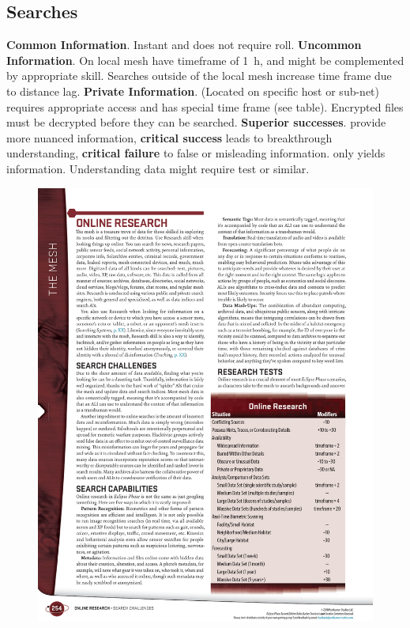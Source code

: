 \subsection*{Searches}

\begin{itemize}
   \itembox \textbf{Common Information}. Instant and does not require roll.
   \itembox \textbf{Uncommon Information}. On local mesh have timeframe of \SI{1}{h}, and might be complemented by appropriate  skill. Searches outside of the local mesh increase time frame due to distance lag.
   \itembox \textbf{Private Information}. (Located on specific host or sub-net) requires appropriate access and has special time frame (see table). Encrypted files must be decrypted before they can be searched.
   \itembox \textbf{Superior successes}. provide more nuanced information, \textbf{critical success} leads to breakthrough understanding, \textbf{critical failure} to false or misleading information.
   \itembox {} only yields information. Understanding data might require  test or similar.
\end{itemize}


\begin{figure}[htbp!]%
   \centering
   \includegraphics[scale=0.9]{gfx/mesh-research}%
\end{figure}%

